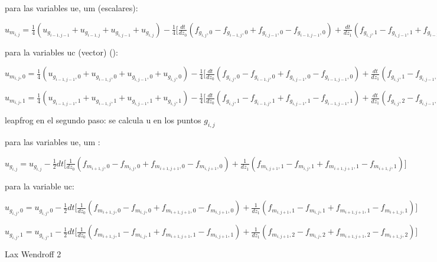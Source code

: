 \documentclass{article}
\begin{document}
\begin{description}
\item para las variables ue, um (escalares):
\item $u_{m_{i,j}} = \frac{1}{4}  (u_{g_{i-1,j-1}} + u_{g_{i-1,j}} + u_{g_{i,j-1}} + u_{g_{i,j}}) - \frac{1}{4}\big[
\frac{dt}{dz_0} (f_{g_{i,j},0} - f_{g_{i-1,j},0} + f_{g_{i,j-1},0} - f_{g_{i-1,j-1},0} ) +
\frac{dt}{dz_1} (f_{g_{i,j},1} - f_{g_{i,j-1},1} + f_{g_{i-1,j},1} - f_{g_{i-1,j-1},1} )  \big] $
\item para la variables uc (vector) ():
\item $u_{m_{i,j},0} = \frac{1}{4}  (u_{g_{i-1,j-1},0} + u_{g_{i-1,j},0} + u_{g_{i,j-1},0} + u_{g_{i,j},0}) - \frac{1}{4}\big[
\frac{dt}{dz_0} (f_{g_{i,j},0} - f_{g_{i-1,j},0} + f_{g_{i,j-1},0} - f_{g_{i-1,j-1},0} ) +
\frac{dt}{dz_1} (f_{g_{i,j},1} - f_{g_{i,j-1},1} + f_{g_{i-1,j},1} - f_{g_{i-1,j-1},1} )  \big] $
\item $u_{m_{i,j},1} = \frac{1}{4}  (u_{g_{i-1,j-1},1} + u_{g_{i-1,j},1} + u_{g_{i,j-1},1} + u_{g_{i,j},1}) - \frac{1}{4}\big[
\frac{dt}{dz_0} (f_{g_{i,j},1} - f_{g_{i-1,j},1} + f_{g_{i,j-1},1} - f_{g_{i-1,j-1},1} ) +
\frac{dt}{dz_1} (f_{g_{i,j},2} - f_{g_{i,j-1},2} + f_{g_{i-1,j},2} - f_{g_{i-1,j-1},2} )  \big] $

\item leapfrog en el segundo paso: se calcula u en los puntos $g_{i,j}$
\item para las variables ue, um :
\item  $u_{g_{i,j}} = u_{g_{i,j}} - \frac{1}{2} dt  \big[ \frac{1}{dz_0} (f_{m_{i+1,j},0} - f_{m_{i,j},0} + 
f_{m_{i+1,j+1},0} - f_{m_{i,j+1},0} )  +  \frac{1}{dz_1}
(f_{m_{i,j+1},1} - f_{m_{i,j},1} + f_{m_{i+1,j+1},1} - f_{m_{i+1,j},1}) \big] $
\item para la variable uc:
\item  $u_{g_{i,j},0} = u_{g_{i,j},0} - \frac{1}{2} dt  \big[ \frac{1}{dz_0} (f_{m_{i+1,j},0} - f_{m_{i,j},0} + 
f_{m_{i+1,j+1},0} - f_{m_{i,j+1},0} )  +  \frac{1}{dz_1}
(f_{m_{i,j+1},1} - f_{m_{i,j},1} + f_{m_{i+1,j+1},1} - f_{m_{i+1,j},1}) \big] $
\item  $u_{g_{i,j},1} = u_{g_{i,j},1} - \frac{1}{2} dt  \big[ \frac{1}{dz_0} (f_{m_{i+1,j},1} - f_{m_{i,j},1} + 
f_{m_{i+1,j+1},1} - f_{m_{i,j+1},1} )  +  \frac{1}{dz_1}
(f_{m_{i,j+1},2} - f_{m_{i,j},2} + f_{m_{i+1,j+1},2} - f_{m_{i+1,j},2}) \big] $


\newpage





\item Lax Wendroff 2


\end{description}
\end{document}
